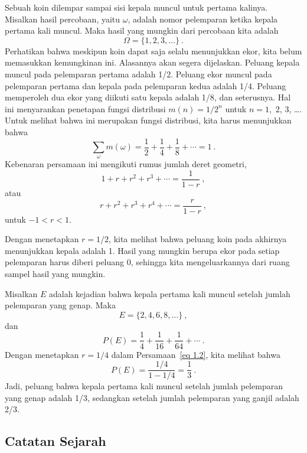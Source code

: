\begin{example}\label{exam 1.10}
Sebuah koin dilempar sampai sisi kepala muncul untuk pertama kalinya.  Misalkan hasil
percobaan, yaitu $\omega$, adalah nomor pelemparan ketika kepala pertama kali muncul.  Maka
hasil yang mungkin dari percobaan kita adalah
$$
\Omega = \{1,2,3, \dots\}\ .
$$
Perhatikan bahwa meskipun koin dapat saja selalu menunjukkan ekor, kita belum
memasukkan kemungkinan ini.  Alasannya akan segera dijelaskan.  Peluang
kepala muncul pada pelemparan pertama adalah 1/2.  Peluang
ekor muncul pada pelemparan pertama dan kepala pada pelemparan kedua adalah 1/4.  Peluang
memperoleh dua ekor yang diikuti satu kepala adalah 1/8, dan seterusnya. 
Hal ini menyarankan penetapan fungsi distribusi $m(n) = 1/2^n$ untuk $n = 1$,~2, 3, \dots. 
Untuk
melihat bahwa ini merupakan fungsi distribusi, kita harus menunjukkan bahwa
$$
\sum_{\omega} m(\omega) = \frac12 + \frac14 + \frac18 + \cdots = 1\ .
$$
Kebenaran persamaan ini mengikuti rumus jumlah deret geometri,
$$
1 + r + r^2 + r^3 + \cdots = \frac1{1-r}\ ,
$$
atau
\begin{equation}
r + r^2 + r^3 + r^4 + \cdots = \frac r{1-r}\ ,
\label{eq 1.2}
\end{equation} 
untuk $-1 < r < 1$.
\par
Dengan menetapkan $r = 1/2$, kita melihat bahwa peluang koin pada akhirnya
menunjukkan kepala adalah 1.  Hasil yang mungkin berupa ekor pada setiap pelemparan harus
diberi
peluang 0, sehingga kita mengeluarkannya dari ruang sampel
hasil yang mungkin.

Misalkan $E$ adalah kejadian bahwa kepala pertama kali muncul setelah jumlah
pelemparan yang genap.  Maka
$$
E = \{2,4,6,8, \dots\}\ ,
$$
dan
$$
P(E) = \frac14 + \frac1{16} + \frac1{64} +\cdots\ .
$$
Dengan menetapkan $r = 1/4$ dalam Persamaan~\ref{eq 1.2}, kita melihat bahwa              
$$
P(E) = \frac{1/4}{1 - 1/4} = \frac13\ .
$$
Jadi, peluang bahwa kepala pertama kali muncul setelah jumlah
pelemparan yang genap adalah 1/3, sedangkan setelah jumlah pelemparan yang ganjil adalah 2/3.
\end{example}

\subsection*{Catatan Sejarah}

